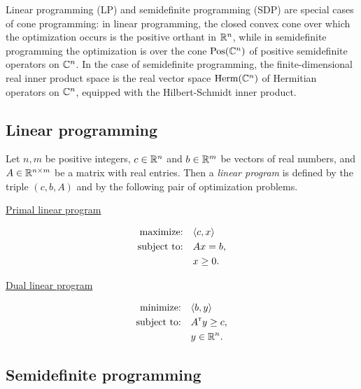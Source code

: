 Linear programming (LP) and semidefinite programming (SDP) are special cases of cone
programming: in linear programming, the closed convex cone over which the
optimization occurs is the positive orthant in $\mathbb{R}^n$, while in semidefinite
programming the optimization is over the cone $\mathrm{Pos}(\mathbb{C}^n)$ of positive
semidefinite operators on $\mathbb{C}^n$.
In the case of semidefinite programming, the finite-dimensional real inner
product space is the real vector space $\mathrm{Herm}(\mathbb{C}^n)$ of Hermitian
operators on $\mathbb{C}^n$, equipped with the Hilbert-Schmidt inner product.

\subsection*{Linear programming}
\label{sec:linear-programming}
Let $n,m$ be positive integers, $c\in\mathbb{R}^{n}$ and $b\in\mathbb{R}^{m}$ be vectors
of real numbers, and $A \in\mathbb{R}^{n\times m}$ be a matrix with real entries. 
Then a \emph{linear program} is defined by the triple $(c,b,A)$ and by the 
following pair of optimization problems.
\begin{center}
  \begin{minipage}{2in}
    \centerline{\underline{Primal linear program}}\vspace{-7mm}
    \begin{align*}
      \text{maximize:}\quad & \langle c , x\rangle\\
      \text{subject to:}\quad & A x = b,\\
      & x \geq 0.
    \end{align*}
  \end{minipage}
  \hspace*{1.5cm}
  \begin{minipage}{2.4in}
    \centerline{\underline{Dual linear program}}\vspace{-7mm}
    \begin{align*}
      \text{minimize:}\quad & \langle b , y\rangle\\
      \text{subject to:}\quad & A^{{\scriptscriptstyle\mathsf{T}}}y \geq c,\\
      & y\in\mathbb{R}^{n}.
    \end{align*}
  \end{minipage}
\end{center}


\subsection*{Semidefinite programming}
\label{sec:semidefinite-programming}

